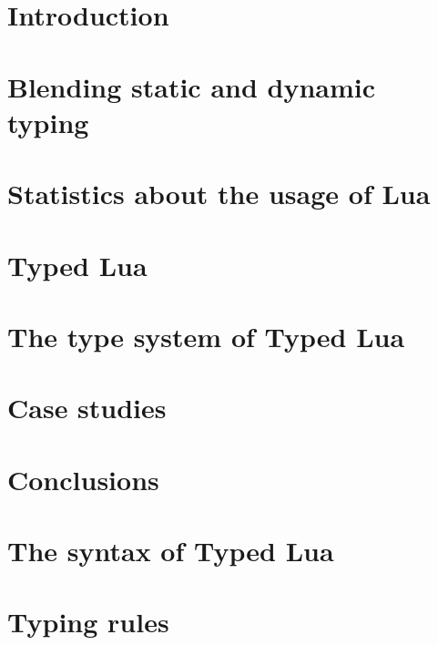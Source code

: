 \documentclass[pdftex,12pt,a4paper]{report}
\begin{document}
\chapter{Introduction}
\label{chap:intro}


\chapter{Blending static and dynamic typing}
\label{chap:review}


\chapter{Statistics about the usage of Lua}
\label{chap:statistics}


\chapter{Typed Lua}
\label{chap:typedlua}


\chapter{The type system of Typed Lua}
\label{chap:system}


\chapter{Case studies}
\label{chap:cases}


\chapter{Conclusions}
\label{chap:conc}


\appendix

\chapter{The syntax of Typed Lua}
\label{app:syntax}


\chapter{Typing rules}
\label{app:rules}




\end{document}
